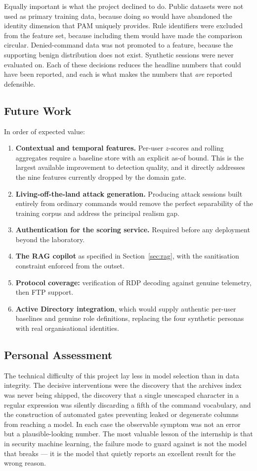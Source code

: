 \documentclass{classeENS}
\begin{document}
Equally important is what the project declined to do. Public datasets were not used as primary training data, because doing so would have abandoned the identity dimension that PAM uniquely provides. Rule identifiers were excluded from the feature set, because including them would have made the comparison circular. Denied-command data was not promoted to a feature, because the supporting benign distribution does not exist. Synthetic sessions were never evaluated on. Each of these decisions reduces the headline numbers that could have been reported, and each is what makes the numbers that \emph{are} reported defensible.

\subsection{Future Work}
In order of expected value:

\begin{enumerate}
    \item \textbf{Contextual and temporal features.} Per-user $z$-scores and rolling aggregates require a baseline store with an explicit as-of bound. This is the largest available improvement to detection quality, and it directly addresses the nine features currently dropped by the domain gate.
    \item \textbf{Living-off-the-land attack generation.} Producing attack sessions built entirely from ordinary commands would remove the perfect separability of the training corpus and address the principal realism gap.
    \item \textbf{Authentication for the scoring service.} Required before any deployment beyond the laboratory.
    \item \textbf{The RAG copilot} as specified in Section~\ref{sec:rag}, with the sanitisation constraint enforced from the outset.
    \item \textbf{Protocol coverage:} verification of RDP decoding against genuine telemetry, then FTP support.
    \item \textbf{Active Directory integration}, which would supply authentic per-user baselines and genuine role definitions, replacing the four synthetic personas with real organisational identities.
\end{enumerate}

\subsection{Personal Assessment}
The technical difficulty of this project lay less in model selection than in data integrity. The decisive interventions were the discovery that the archives index was never being shipped, the discovery that a single unescaped character in a regular expression was silently discarding a fifth of the command vocabulary, and the construction of automated gates preventing leaked or degenerate columns from reaching a model. In each case the observable symptom was not an error but a plausible-looking number. The most valuable lesson of the internship is that in security machine learning, the failure mode to guard against is not the model that breaks --- it is the model that quietly reports an excellent result for the wrong reason.
\end{document}
